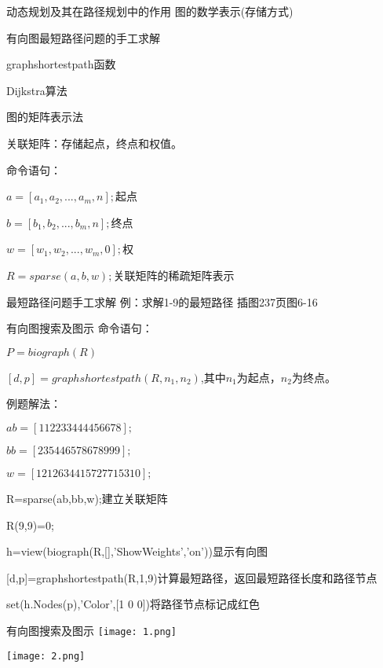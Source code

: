 \documentclass[12pt]{beamer}
\begin{document}
\begin{frame}[allowframebreaks]{动态规划及其在路径规划中的作用}
         图的数学表示(存储方式)
         
         有向图最短路径问题的手工求解
         
         graphshortestpath函数
         
         Dijkstra算法
\end{frame}

\begin{frame}[allowframebreaks]{图的矩阵表示法}

关联矩阵：存储起点，终点和权值。

命令语句：

$a=[a_1,a_2,...,a_m,n];$起点

$b=[b_1,b_2,...,b_m,n];$终点

$w=[w_1,w_2,...,w_m,0];$权

$R=sparse(a,b,w);$关联矩阵的稀疏矩阵表示

\end{frame}

\begin{frame}[allowframebreaks]{最短路径问题手工求解}
例：求解1-9的最短路径
插图237页图6-16
\end{frame}
\begin{frame}[allowframebreaks]{有向图搜索及图示}
命令语句：

$P=biograph(R)$

$[d,p]=graphshortestpath(R,n_1,n_2)$,其中$n_1$为起点，$n_2$为终点。

例题解法：

$ab=[1 1 2 2 3 3 4 4 4 4 5 6 6 7 8];$

$bb=[2 3 5 4 4 6 5 7 8 6 7 8 9 9 9];$

$w=[1 2 12 6 3 4 4 15 7 2 7 7 15 3 10];$

R=sparse(ab,bb,w);建立关联矩阵

R(9,9)=0;

h=view(biograph(R,[],'ShowWeights','on'))显示有向图

[d,p]=graphshortestpath(R,1,9)计算最短路径，返回最短路径长度和路径节点
 
set(h.Nodes(p),'Color',[1 0 0])将路径节点标记成红色

\end{frame}

\begin{frame}[allowframebreaks]{有向图搜索及图示}
\texttt{[image: 1.png]}

\texttt{[image: 2.png]}

\end{frame}
\end{document}
